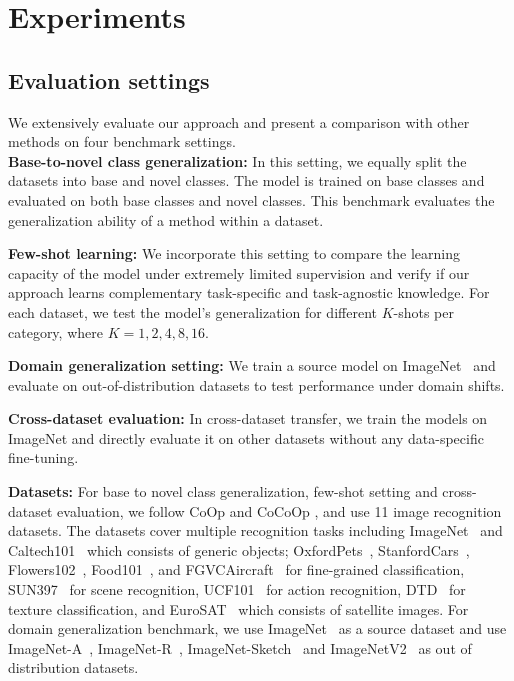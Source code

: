 \documentclass[10pt,twocolumn,letterpaper]{article}
\begin{document}
\section{Experiments}
\subsection{Evaluation settings}
We extensively evaluate our approach and present a comparison with other methods on four benchmark settings. \\
\textbf{Base-to-novel class generalization:} In this setting, we equally split the datasets into base and novel classes. The model is trained on base classes and evaluated on both base classes and novel classes. This benchmark evaluates the generalization ability of a method within a dataset. 

\noindent \textbf{Few-shot learning:} We incorporate this setting to compare the learning capacity of the model under extremely limited supervision and verify if our approach learns {complementary} task-specific and task-agnostic knowledge. For each dataset, we test the model's generalization for different $K$-shots per category, where $K = 1, 2, 4, 8, 16$.  

\noindent \textbf{Domain generalization setting:} We train a source model on ImageNet~\cite{deng2009imagenet} and evaluate on out-of-distribution datasets to test performance under domain shifts. 

\noindent \textbf{Cross-dataset evaluation:} In cross-dataset transfer, we train the models on ImageNet \cite{deng2009imagenet} and directly evaluate it on other datasets without any data-specific fine-tuning. 

\noindent \textbf{Datasets:} For base to novel class generalization, few-shot setting and cross-dataset evaluation, we follow CoOp \cite{zhou2022learning} and CoCoOp \cite{zhou2022conditional}, and use 11 image recognition datasets. The datasets cover multiple recognition tasks including ImageNet~\cite{deng2009imagenet} and Caltech101~\cite{fei2004learning} which consists of generic objects; OxfordPets~\cite{parkhi2012cats}, StanfordCars~\cite{krause20133d}, Flowers102~\cite{nilsback2008automated}, Food101~\cite{bossard2014food}, and FGVCAircraft~\cite{maji2013fine} for fine-grained classification, SUN397~\cite{xiao2010sun} for scene recognition, UCF101~\cite{soomro2012ucf101} for action recognition, DTD~\cite{cimpoi2014describing} for texture classification, and EuroSAT~\cite{helber2019eurosat} which consists of satellite images. For domain generalization benchmark, we use ImageNet~\cite{deng2009imagenet} as a source dataset and use ImageNet-A~\cite{hendrycks2021natural}, ImageNet-R~\cite{hendrycks2021many}, ImageNet-Sketch~\cite{wang2019learning} and ImageNetV2~\cite{recht2019imagenet} as out of distribution datasets.
\end{document}
